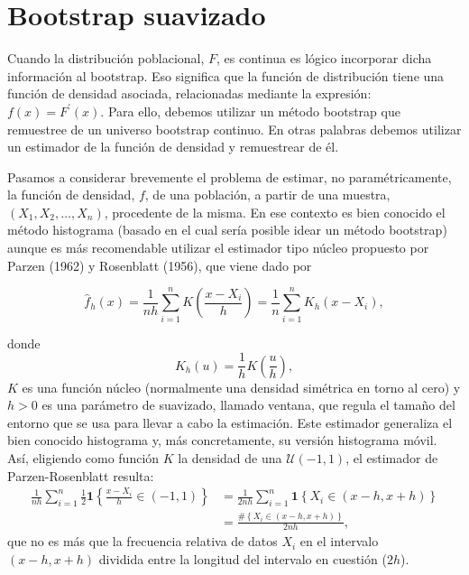 \documentclass[]{book}
\theoremstyle{break}
\theoremstyle{definition}
\theoremstyle{definition}
\theoremstyle{definition}
\theoremstyle{remark}
\begin{document}
\section{Bootstrap suavizado}\label{modunif-boot-suav}

Cuando la distribución poblacional, \(F\), es continua es lógico
incorporar dicha información al bootstrap. Eso significa que la función
de distribución tiene una función de densidad asociada, relacionadas
mediante la expresión:
\(f\left( x \right) =F^{\prime}\left( x \right)\). Para ello, debemos
utilizar un método bootstrap que remuestree de un universo bootstrap
continuo. En otras palabras debemos utilizar un estimador de la función
de densidad y remuestrear de él.

Pasamos a considerar brevemente el problema de estimar, no
paramétricamente, la función de densidad, \(f\), de una población, a
partir de una muestra, \(\left( X_1,X_2,\ldots ,X_n \right)\),
procedente de la misma. En ese contexto es bien conocido el método
histograma (basado en el cual sería posible idear un método bootstrap)
aunque es más recomendable utilizar el estimador tipo núcleo propuesto
por Parzen (1962) y Rosenblatt (1956), que viene dado por

\[\hat{f}_{h}\left( x \right) =\frac{1}{nh}\sum_{i=1}^{n}K\left( \frac{x-X_i}{
h} \right) =\frac{1}{n}\sum_{i=1}^{n}K_{h}\left( x-X_i \right),\]

donde \[K_{h}\left( u \right) =\frac{1}{h}K\left( \frac{u}{h} \right),\]
\(K\) es una función núcleo (normalmente una densidad simétrica en torno
al cero) y \(h>0\) es una parámetro de suavizado, llamado ventana, que
regula el tamaño del entorno que se usa para llevar a cabo la
estimación. Este estimador generaliza el bien conocido histograma y, más
concretamente, su versión histograma móvil. Así, eligiendo como función
\(K\) la densidad de una \(\mathcal{U}\left( -1,1 \right)\), el
estimador de Parzen-Rosenblatt resulta: \[\begin{aligned}
\frac{1}{nh}\sum_{i=1}^{n}\frac{1}{2}\mathbf{1}\left\{ \frac{x-X_i}{h}\in
\left( -1,1 \right) \right\} &= \frac{1}{2nh}\sum_{i=1}^{n}\mathbf{1}\left\{
X_i\in \left( x-h,x+h \right) \right\} \\
&= \frac{\#\left\{ X_i\in \left( x-h,x+h \right) \right\} }{2nh},
\end{aligned}\] que no es más que la frecuencia relativa de datos
\(X_i\) en el intervalo \(\left( x-h,x+h \right)\) dividida entre la
longitud del intervalo en cuestión (\(2h\)).
\end{document}
